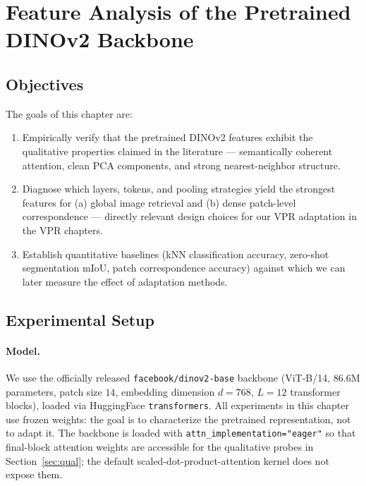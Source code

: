 \documentclass[11pt,a4paper]{article}
\begin{document}
\newpage
\section{Feature Analysis of the Pretrained DINOv2 Backbone}
\label{ch:analysis}

\noindent{}
\vspace{1em}

\subsection{Objectives}

The goals of this chapter are:
\begin{enumerate}[leftmargin=*,label=(G\arabic*)]
\item \label{g:verify} Empirically verify that the pretrained DINOv2
features exhibit the qualitative properties claimed in the
literature --- semantically coherent attention, clean PCA components,
and strong nearest-neighbor structure.
\item \label{g:diagnose} Diagnose which layers, tokens, and pooling
strategies yield the strongest features for (a) global image retrieval
and (b) dense patch-level correspondence --- directly relevant design
choices for our VPR adaptation in the VPR chapters.
\item \label{g:baseline} Establish quantitative baselines (kNN
classification accuracy, zero-shot segmentation mIoU, patch
correspondence accuracy) against which we can later measure the effect
of adaptation methods.
\end{enumerate}

\subsection{Experimental Setup}
\label{sec:setup}

\paragraph{Model.} We use the officially released
\texttt{facebook/dinov2-base} backbone (ViT-B/14, 86.6M parameters, patch
size $14$, embedding dimension $d=768$, $L=12$ transformer blocks), loaded
via HuggingFace \texttt{transformers}. All experiments in this chapter use
frozen weights: the goal is to characterize the pretrained representation,
not to adapt it. The backbone is loaded with
\texttt{attn\_implementation="eager"} so that final-block attention weights
are accessible for the qualitative probes in Section~\ref{sec:qual};
the default scaled-dot-product-attention kernel does not expose them.
\end{document}
